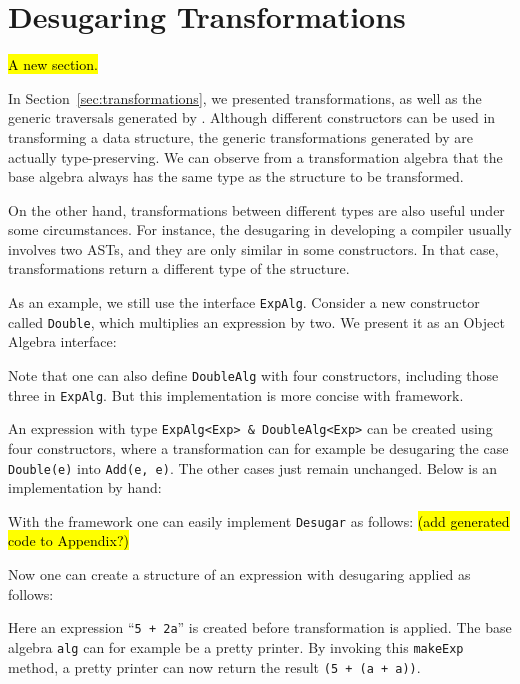 \section{Desugaring Transformations}\label{sec:heterotrans}

\hl{A new section.}

In Section~\ref{sec:transformations}, we presented transformations, as well as the generic traversals generated by \name. Although different constructors can be used in transforming a data structure, the generic transformations generated by \name are actually type-preserving. We can observe from a transformation algebra that the base algebra always has the same type as the structure to be transformed.

On the other hand, transformations between different types are also useful under some circumstances. For instance, the desugaring in developing a compiler usually involves two ASTs, and they are only similar in some constructors. In that case, transformations return a different type of the structure.

As an example, we still use the interface \lstinline{ExpAlg}. Consider a new constructor called \lstinline{Double}, which multiplies an expression by two. We present it as an Object Algebra interface:


\noindent Note that one can also define \lstinline{DoubleAlg} with four constructors, including those three in \lstinline{ExpAlg}. But this implementation is more concise with \name framework.

An expression with type \lstinline{ExpAlg<Exp> & DoubleAlg<Exp>} can be created using four constructors, where a transformation can for example be desugaring the case \lstinline{Double(e)} into \lstinline{Add(e, e)}. The other cases just remain unchanged. Below is an implementation by hand:


\noindent With the \name framework one can easily implement \lstinline{Desugar} as follows: \hl{(add generated code to Appendix?)}


\noindent Now one can create a structure of an expression with desugaring applied as follows:


\noindent Here an expression ``\lstinline{5 + 2a}'' is created before transformation is applied. The base algebra \lstinline{alg} can for example be a pretty printer. By invoking this \lstinline{makeExp} method, a pretty printer can now return the result \lstinline{(5 + (a + a))}.

